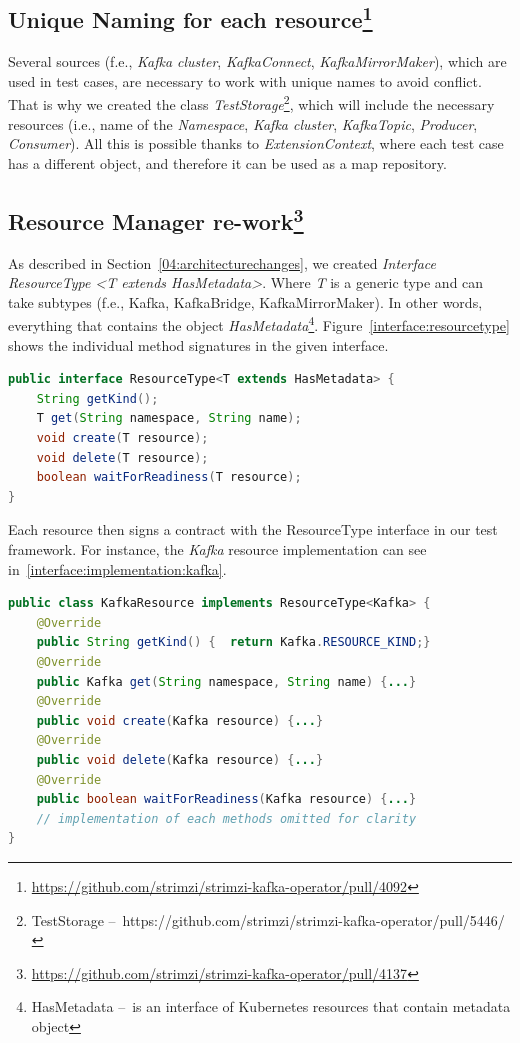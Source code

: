 \subsection{Unique Naming for each resource\protect\footnote{\url{https://github.com/strimzi/strimzi-kafka-operator/pull/4092}}}
\label{05:sub:sec:unique}

Several sources (f.e., \emph{Kafka cluster}, \emph{KafkaConnect}, \emph{KafkaMirrorMaker}), which are used in test cases,
are necessary to work with unique names to avoid conflict.
That is why we created the class \emph{TestStorage}\footnote{TestStorage \---\ https://github.com/strimzi/strimzi-kafka-operator/pull/5446/},
which will include the necessary resources (i.e., name of the \emph{Namespace}, \emph{Kafka cluster}, \emph{KafkaTopic}, \emph{Producer}, \emph{Consumer}).
All this is possible thanks to \emph{ExtensionContext}, where each test case has a different object, and therefore it can be used as a map repository.

\subsection{Resource Manager re-work\protect\footnote{\url{https://github.com/strimzi/strimzi-kafka-operator/pull/4137}}}
\label{05:sub:sec:resourcemanager}

As described in Section~\ref{04:architecturechanges}, we created \emph{Interface ResourceType <T extends HasMetadata>}.
Where \emph{T} is a generic type and can take subtypes (f.e., Kafka, KafkaBridge, KafkaMirrorMaker).
In other words, everything that contains the object \emph{HasMetadata}\footnote{HasMetadata \---\ is an interface of
Kubernetes resources that contain metadata object}.
Figure~\ref{interface:resourcetype} shows the individual method signatures in the given interface.

\begin{lstlisting}[language=Java,label=interface:resourcetype,caption=Interface used across all resources,frame=tb]
public interface ResourceType<T extends HasMetadata> {
    String getKind();
    T get(String namespace, String name);
    void create(T resource);
    void delete(T resource);
    boolean waitForReadiness(T resource);
}
\end{lstlisting}
Each resource then signs a contract with the ResourceType interface in our test framework.
For instance, the \emph{Kafka} resource implementation can see in~\ref{interface:implementation:kafka}.
\begin{lstlisting}[language=Java,label=interface:implementation:kafka,caption=Kafka resource sings contract with ResourceType interface,frame=tb]
public class KafkaResource implements ResourceType<Kafka> {
    @Override
    public String getKind() {  return Kafka.RESOURCE_KIND;}
    @Override
    public Kafka get(String namespace, String name) {...}
    @Override
    public void create(Kafka resource) {...}
    @Override
    public void delete(Kafka resource) {...}
    @Override
    public boolean waitForReadiness(Kafka resource) {...}
    // implementation of each methods omitted for clarity
}
\end{lstlisting}

